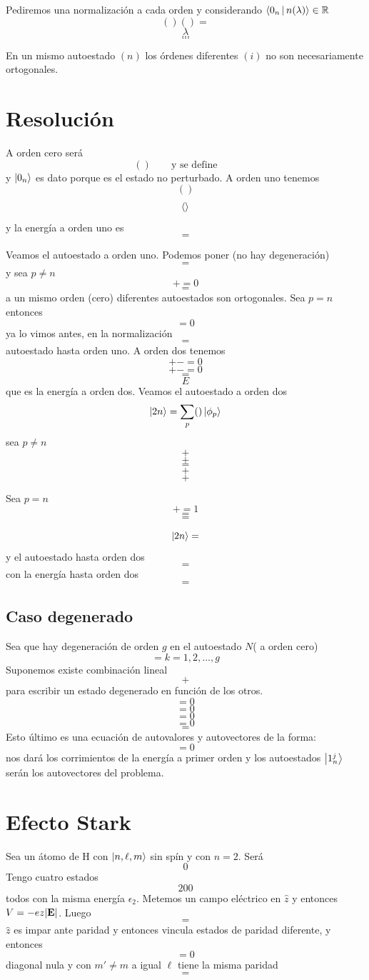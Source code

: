 \documentclass[10pt,oneside]{CBFT_book}
\begin{document}
Pediremos una normalización a cada orden y considerando $ \Braket{0_n|n(\lambda)} \in \mathbb{R}$
\[
	()() =
\]
\[
	\lambda
\]
\[
	...
\]
\[
	...
\]

En un mismo autoestado $(n)$ los órdenes diferentes $(i)$ no son necesariamente ortogonales.

\section{Resolución}

A orden cero será 
\[
	() \qquad \text{y se define} \qquad 
\]
y $\Ket{0_n}$ es dato porque es el estado no perturbado.
A orden uno tenemos 
\[
	()
\]
\[
	\Braket{}
\]
y la energía a orden uno es 
\[
	=
\]

Veamos el autoestado a orden uno. Podemos poner (no hay degeneración)
\[
	=
\]
y sea $p\neq n$
\[
	+ = 0
\]
\[
	=
\]
a un mismo orden (cero) diferentes autoestados son ortogonales.
Sea $p=n$ entonces 
\[
	= 0 
\]
ya lo vimos antes, en la normalización
\[
	=
\]
autoestado hasta orden uno. A orden dos tenemos 
\[
	+ - = 0
\]
\[
	+ - = 0
\]
\[
	=
\]
\[
	E
\]
que es la energía a orden dos.
Veamos el autoestado a orden dos 
\[
	\Ket{2n} = \sum_p ()\Ket{\phi_p}
\]
sea $p\neq n$ 
\[
	+
\]
\[
	+
\]
\[
	=
\]
\[
	+
\]
\[
	+
\]

Sea $p=n$
\[
	+ = 1
\]
\[
	=
\]
\[
	=
\]

\[
	\Ket{2n} =
\]
y el autoestado hasta orden dos
\[
	=
\]
con la energía hasta orden dos 
\[
	=
\]

\subsection{Caso degenerado}

Sea que hay degeneración de orden $g$ en el autoestado $N$( a orden cero)
\[
	= k=1,2,...,g
\]
Suponemos existe combinación lineal 
\[
	+
\]
para escribir un estado degenerado en función de los otros.
\[
	= 0
\]
\[
	= 0
\]
\[
	=0
\]
\[
	=0
\]
\[
	=
\]
Esto último es una ecuación de autovalores y autovectores de la forma:
\[
	= 0 
\]
nos dará los corrimientos de la energía a primer orden  y los autoestados $\Ket{1_n^j}$ serán los 
autovectores del problema.

\section{Efecto Stark}

Sea un átomo de H con $\Ket{n,\ell,m}$ sin spín y con $n=2$. Será 
\[
	0
\]
Tengo cuatro estados 
\[
	2 0 0 
\]
todos con la misma energía $\epsilon_2$.
Metemos un campo eléctrico en $\hat{z}$ y entonces $V=-ez|\vb{E}|$. Luego 
\[
	=
\]
$\hat{z}$ es impar ante paridad y entonces vincula estados de paridad diferente,
y entonces 
\[
	= 0 
\]
diagonal nula y con $m'\neq m$ a igual $\ell$ tiene la misma paridad
\[
	=
\]
\end{document}
